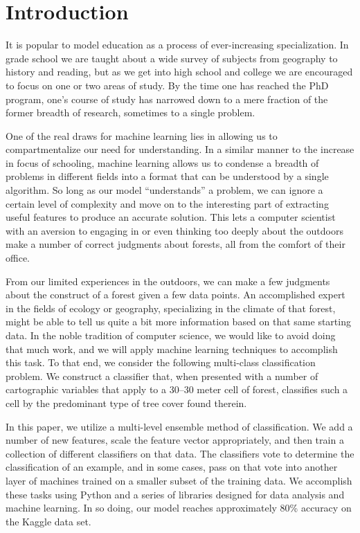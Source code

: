 \section{Introduction}
\label{sec:-intro}

It is popular to model education as a process of ever-increasing 
specialization. In grade school we are taught about a wide survey of
subjects from geography to history and reading, but as we get into high school
and college we are encouraged to focus on one or two areas of study.
By the time one has reached the PhD 
program, one's course of study has narrowed down to a mere fraction of 
the former breadth of research, sometimes to a single problem.

One of the real draws for machine learning lies in allowing us to 
compartmentalize our need for understanding. In a similar manner to the increase in
focus of schooling, machine learning allows us to condense a breadth of problems
in different fields into a format that can be understood by a single algorithm.
So long as our model 
``understands'' a problem, we can ignore a certain level of complexity 
and move on to the interesting part of extracting useful features to
produce an accurate solution.  This lets a computer scientist 
with an aversion to engaging in or even thinking too deeply about the 
outdoors make a number of correct judgments about forests, 
all from the comfort of their office.

From our limited experiences in the outdoors, we can make a few judgments about
the construct of a forest given a few data points. An accomplished expert 
in the fields of ecology or geography, specializing in the climate of 
that forest, might be able to tell us quite a bit more information based 
on that same starting data.  In the noble tradition of computer science, we 
would like to avoid doing that much work, and we will apply machine 
learning techniques to accomplish this task.  To that end, we consider 
the following multi-class classification problem. We construct a 
classifier that, when presented with a number of cartographic variables 
that apply to a 30--30 meter cell of forest, classifies such a cell by 
the predominant type of tree cover found therein.

In this paper, we utilize a multi-level ensemble method of 
classification.  We add a number of new features, scale the feature 
vector appropriately, and then train a collection of different 
classifiers on that data.  The classifiers vote to determine the 
classification of an example, and in some cases, pass on that vote into 
another layer of machines trained on a smaller subset of the training 
data.  We accomplish these tasks using Python and a series of libraries 
designed for data analysis and machine learning.  In so doing, our model 
reaches approximately 80\% accuracy on the Kaggle data set. 







